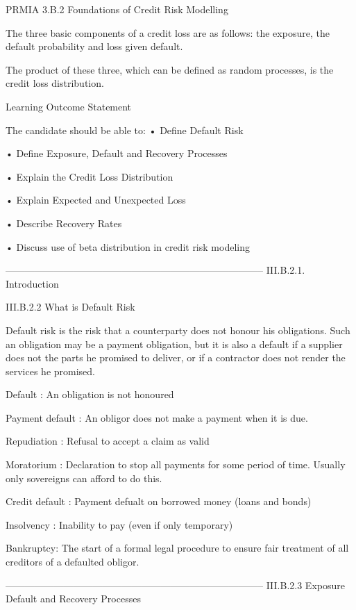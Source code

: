 
PRMIA 3.B.2 Foundations of Credit Risk Modelling


The three basic components of a credit loss are as follows: the exposure, the default probability and loss given default. 

The product of these three, which can be defined as random processes, is the credit loss distribution.


Learning Outcome Statement

The candidate should be able to:
•
  Define Default Risk

•
  Define Exposure, Default and Recovery Processes

•
  Explain the Credit Loss Distribution

•
  Explain Expected and Unexpected Loss

•
  Describe Recovery Rates

•
  Discuss use of beta distribution in credit risk modeling



--------------------------------------------------------------------------------
III.B.2.1. Introduction

III.B.2.2 What is Default Risk

Default risk is the risk that a counterparty does not honour his obligations. Such an obligation may be a payment obligation, but it is also a default if a supplier does not the parts he promised to deliver, or if a contractor does not render the services he promised.

 

Default :  An obligation is not honoured

 

Payment default :  An obligor does not make a payment when it is due.

 

Repudiation : Refusal to accept a claim as valid

Moratorium : Declaration to stop all payments for some period of time. Usually only sovereigns can afford to do this.

Credit default :  Payment defualt on borrowed money (loans and bonds)

 

Insolvency : Inability to pay (even if only temporary)

 

Bankruptcy: The start of a formal legal procedure to ensure fair treatment of all creditors of a defaulted obligor. 


--------------------------------------------------------------------------------
III.B.2.3 Exposure Default and Recovery Processes

